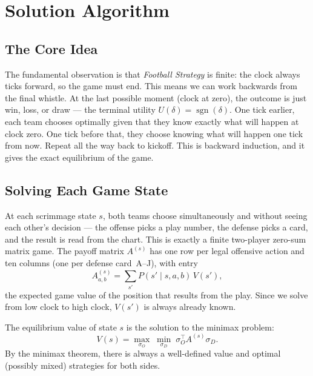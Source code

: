 \documentclass[11pt,letterpaper]{article}
\begin{document}
\section{Solution Algorithm}
\label{sec:algorithm}

\subsection{The Core Idea}

The fundamental observation is that \emph{Football Strategy} is finite: the clock
always ticks forward, so the game must end.  This means we can work backwards from
the final whistle.  At the last possible moment (clock at zero), the outcome is just
win, loss, or draw --- the terminal utility $U(\delta) = \operatorname{sgn}(\delta)$.
One tick earlier, each team chooses optimally given that they know exactly what will
happen at clock zero.  One tick before that, they choose knowing what will happen one
tick from now.  Repeat all the way back to kickoff.  This is backward induction, and
it gives the exact equilibrium of the game.

\subsection{Solving Each Game State}

At each scrimmage state $s$, both teams choose simultaneously and without seeing each
other's decision --- the offense picks a play number, the defense picks a card, and the
result is read from the chart.  This is exactly a finite two-player zero-sum matrix game.
The payoff matrix $A^{(s)}$ has one row per legal offensive action and ten columns (one
per defense card~A--J), with entry
\[
  A^{(s)}_{a,b} = \sum_{s'} P(s'\mid s,a,b)\, V(s'),
\]
the expected game value of the position that results from the play.  Since we solve
from low clock to high clock, $V(s')$ is always already known.

The equilibrium value of state $s$ is the solution to the minimax problem:
\begin{equation}
  \label{eq:minimax}
  V(s) = \max_{\sigma_O}\; \min_{\sigma_D}\;
  \sigma_O^\top A^{(s)} \sigma_D.
\end{equation}
By the minimax theorem, there is always a well-defined value and optimal (possibly
mixed) strategies for both sides.
\end{document}
